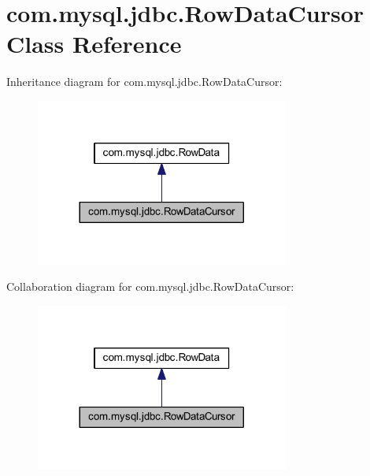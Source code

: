 \hypertarget{classcom_1_1mysql_1_1jdbc_1_1_row_data_cursor}{}\section{com.\+mysql.\+jdbc.\+Row\+Data\+Cursor Class Reference}
\label{classcom_1_1mysql_1_1jdbc_1_1_row_data_cursor}


Inheritance diagram for com.\+mysql.\+jdbc.\+Row\+Data\+Cursor\+:
\nopagebreak
\begin{figure}[H]
\begin{center}
\leavevmode
\includegraphics[width=236pt]{classcom_1_1mysql_1_1jdbc_1_1_row_data_cursor__inherit__graph}
\end{center}
\end{figure}


Collaboration diagram for com.\+mysql.\+jdbc.\+Row\+Data\+Cursor\+:
\nopagebreak
\begin{figure}[H]
\begin{center}
\leavevmode
\includegraphics[width=236pt]{classcom_1_1mysql_1_1jdbc_1_1_row_data_cursor__coll__graph}
\end{center}
\end{figure}

